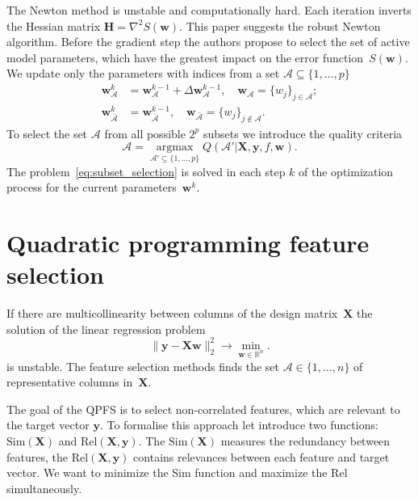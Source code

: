 \documentclass[a4paper,12pt]{article}
\theoremstyle{plain} %
\theoremstyle{definition} %
\theoremstyle{remark} %
\newcommand{\bw}{\mathbf{w}}
\newcommand{\by}{\mathbf{y}}
\newcommand{\cA}{\mathcal{A}}
\newcommand{\bbR}{\mathbb{R}}
\newcommand{\bH}{\mathbf{H}}
\newcommand{\bX}{\mathbf{X}}
\newcommand{\argmax}{\mathop{\arg \max}\limits}
\begin{document}
	The Newton method is unstable and computationally hard. Each iteration inverts the Hessian matrix $\bH = \nabla^2 S(\bw)$.
	This paper suggests the robust Newton algorithm. 
	Before the gradient step the authors propose to select the set of active model parameters, which have the greatest impact on the error function~$S(\bw)$.
	We update only the parameters with indices from a set $\cA \subseteq \{ 1, \dots, p \}$
	\begin{align*}
	\bw_{\cA}^k &= \bw_{\cA}^{k - 1} + \Delta \bw_{\cA}^{k - 1}, \quad \bw_{\cA} = \{w_j\}_{j \in \cA}; \\
	\bw_{\bar{\cA}}^k &= \bw_{\bar{\cA}}^{k - 1}, \quad \bw_{\bar{\cA}} = \{w_j\}_{j \notin \cA}.
	\end{align*}
	To select the set $\cA$ from all possible $2^p$ subsets we introduce the quality criteria 
	\begin{equation}
		\cA = \argmax_{\cA' \subseteq \{1, \dots, p\}} Q(\cA' | \bX, \by, f, \bw).
		\label{eq:subset_selection}
	\end{equation}
	The problem~\eqref{eq:subset_selection} is solved in each step $k$ of the optimization process for the current parameters~$\bw^k$.
	
	\section*{Quadratic programming feature selection}
	If there are multicollinearity between columns of the design matrix~$\bX$ the solution of the linear regression problem
	\begin{equation}
	\| \by - \bX \bw\|_2^2 \rightarrow\min_{\bw \in \bbR^{n}}.
	\label{eq:linear_regression}
	\end{equation}
	is unstable. The feature selection methods finds the set $\cA \in \{1, \dots, n\}$ of representative columns in~$\bX$. 
	
	The goal of the QPFS is to select non-correlated features, which are relevant to the target vector $\by$.
	To formalise this approach let introduce two functions: $\text{Sim}(\bX)$ and $\text{Rel}(\bX, \by)$. 
	The $\text{Sim}(\bX)$ measures the redundancy between features, the $\text{Rel}(\bX, \by)$ contains relevances between each feature and target vector. 
	We want to minimize the Sim function and maximize the Rel simultaneously.
	
\end{document}
